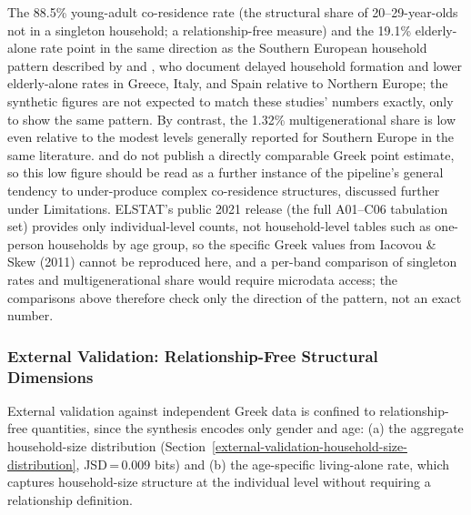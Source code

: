 \documentclass{article}
\begin{document}
The 88.5\% young-adult co-residence rate (the structural share of 20--29-year-olds not in a singleton household; a relationship-free measure) and the 19.1\% elderly-alone rate point in the same direction as the Southern European household pattern described by \citet{Reher1998} and \citet{Iacovou2011HouseholdEU}, who document delayed household formation and lower elderly-alone rates in Greece, Italy, and Spain relative to Northern Europe; the synthetic figures are not expected to match these studies' numbers exactly, only to show the same pattern. By contrast, the 1.32\% multigenerational share is low even relative to the modest levels generally reported for Southern Europe in the same literature. \citet{Reher1998} and \citet{Iacovou2011HouseholdEU} do not publish a directly comparable Greek point estimate, so this low figure should be read as a further instance of the pipeline's general tendency to under-produce complex co-residence structures, discussed further under Limitations. ELSTAT's public 2021 release (the full A01--C06 tabulation set) provides only individual-level counts, not household-level tables such as one-person households by age group, so the specific Greek values from Iacovou \& Skew (2011) cannot be reproduced here, and a per-band comparison of singleton rates and multigenerational share would require microdata access; the comparisons above therefore check only the direction of the pattern, not an exact number.

\subsubsection*{External Validation: Relationship-Free Structural Dimensions}

External validation against independent Greek data is confined to relationship-free quantities, since the synthesis encodes only gender and age: (a) the aggregate household-size distribution (Section~\ref{external-validation-household-size-distribution}, JSD\,=\,0.009 bits) and (b) the age-specific living-alone rate, which captures household-size structure at the individual level without requiring a relationship definition.
\end{document}
